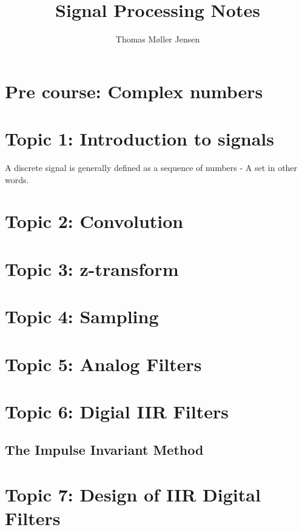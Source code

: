 \documentclass{article}
\title{Signal Processing Notes}
\author{Thomas Møller Jensen}
\begin{document}
\maketitle
\section*{Pre course: Complex numbers}
\section*{Topic 1: Introduction to signals}
A discrete signal is generally defined as a sequence of numbers - A set in other words.\\

\section*{Topic 2: Convolution}
\section*{Topic 3: z-transform}
\section*{Topic 4: Sampling}
\section*{Topic 5: Analog Filters}
\section*{Topic 6: Digial IIR Filters}
\subsection*{The Impulse Invariant Method}
\section*{Topic 7: Design of IIR Digital Filters}
\end{document}
